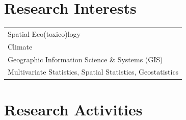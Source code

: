 \section{Research Interests}

\label{Research Interests}

\begin{table}[hp!]

\label{Table CV3}

\begin{tabular}{>{\raggedright\arraybackslash}p{14.0cm}}

Spatial Eco(toxico)logy\\[0.2cm]
Climate\\[0.2cm]
Geographic Information Science \& Systems (GIS)\\[0.2cm]
Multivariate Statistics, Spatial Statistics, Geostatistics\\

\end{tabular}

\end{table}


\section{Research Activities}

\label{Research Activities}

